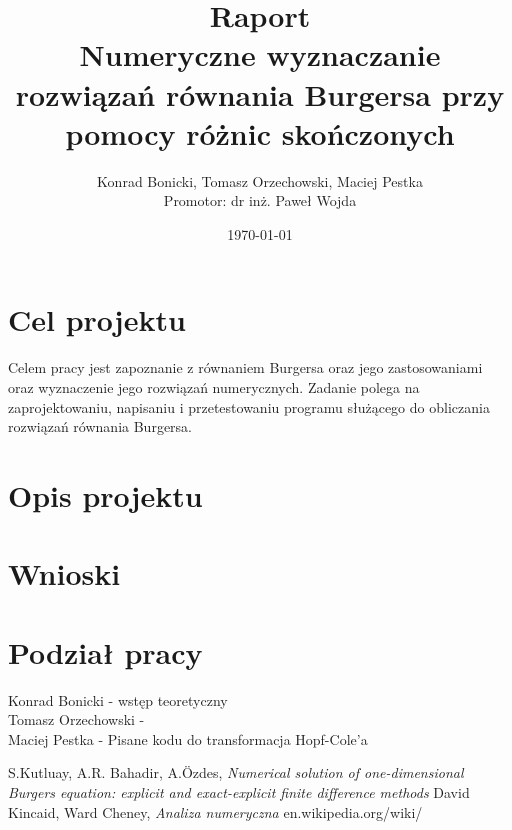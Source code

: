 \documentclass[a4paper,12pt]{article}
\title{Raport \\ Numeryczne wyznaczanie rozwiązań równania Burgersa przy pomocy różnic skończonych}
\author{Konrad Bonicki, Tomasz Orzechowski, Maciej Pestka \\ Promotor: dr inż. Paweł Wojda }
\date{\today}
\begin{document}
\maketitle

\section*{Cel projektu}
Celem pracy jest zapoznanie z równaniem Burgersa oraz jego zastosowaniami oraz wyznaczenie jego rozwiązań numerycznych. Zadanie polega na zaprojektowaniu, napisaniu i przetestowaniu programu służącego do obliczania rozwiązań równania Burgersa. 

\section*{Opis projektu}


\section*{Wnioski}


\section*{Podział pracy}
Konrad Bonicki - wstęp teoretyczny \\ 
Tomasz Orzechowski - \\
Maciej Pestka - Pisane kodu do transformacja Hopf-Cole'a 

\begin{thebibliography}{9}
 S.Kutluay, A.R. Bahadir, A.Özdes, \textit{Numerical solution of one-dimensional Burgers equation: explicit and exact-explicit finite difference methods}
 David Kincaid, Ward Cheney,    \textit{ Analiza numeryczna}
en.wikipedia.org/wiki/
\end{thebibliography}
\end{document}
